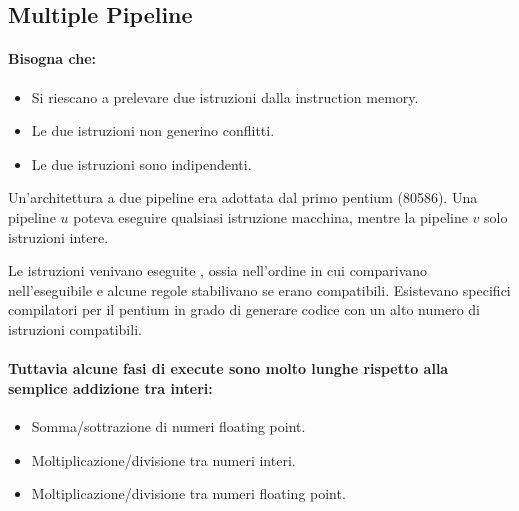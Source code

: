 \subsection{Multiple Pipeline}


\paragraph{Bisogna che:} 

\begin{itemize}
  \item Si riescano a prelevare due istruzioni dalla instruction memory.
  \item Le due istruzioni non generino conflitti. 
  \item Le due istruzioni sono indipendenti.
\end{itemize}


Un'architettura a due pipeline era adottata dal primo pentium (80586). Una pipeline $u$ poteva eseguire qualsiasi istruzione macchina, mentre la pipeline $v$ solo istruzioni intere. 

Le istruzioni venivano eseguite , ossia nell'ordine in cui comparivano nell'eseguibile e alcune regole stabilivano se erano compatibili. Esistevano specifici compilatori per il pentium in grado di generare codice con un alto numero di istruzioni compatibili. 



\paragraph{Tuttavia alcune fasi di execute sono molto lunghe rispetto alla semplice addizione tra interi:} 

\begin{itemize}
  \item Somma/sottrazione di numeri floating point. 
  \item Moltiplicazione/divisione tra numeri interi. 
  \item Moltiplicazione/divisione tra numeri floating point.
\end{itemize}



